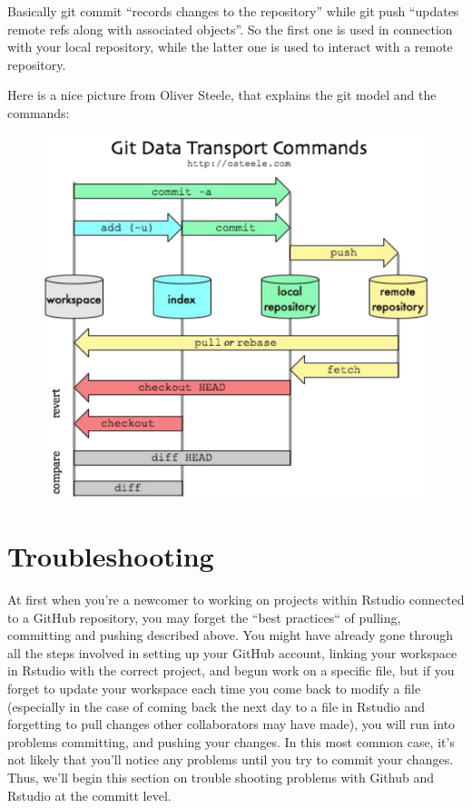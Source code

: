 \documentclass[12pt]{../SOP3_beta}
\begin{document}
\begin{description}
  
Basically git commit ``records changes to the repository'' while git push ``updates remote refs along with associated objects''. So the first one is used in connection with your local repository, while the latter one is used to interact with a remote repository.

Here is a nice picture from Oliver Steele, that explains the git model and the commands:  

\begin{figure}
\includegraphics{graphics/MgaV9}
\end{figure}
   
\end{description}

\section{Troubleshooting}

\NP At first when you're a newcomer to working on projects within Rstudio connected to a GitHub repository, you may forget the ``best practices`` of pulling, committing and pushing described above. You might have already gone through all the steps involved in setting up your GitHub account, linking your workspace in Rstudio with the correct project, and begun work on a specific file, but if you forget to update your workspace each time you come back to modify a file (especially in the case of coming back the next day to a file in Rstudio and forgetting to pull changes other collaborators may have made), you will run into problems committing, and pushing your changes. In this most common case, it's not likely that you'll notice any problems until you try to commit your changes. Thus, we'll begin this section on trouble shooting problems with Github and Rstudio at the committ level.
\end{document}

